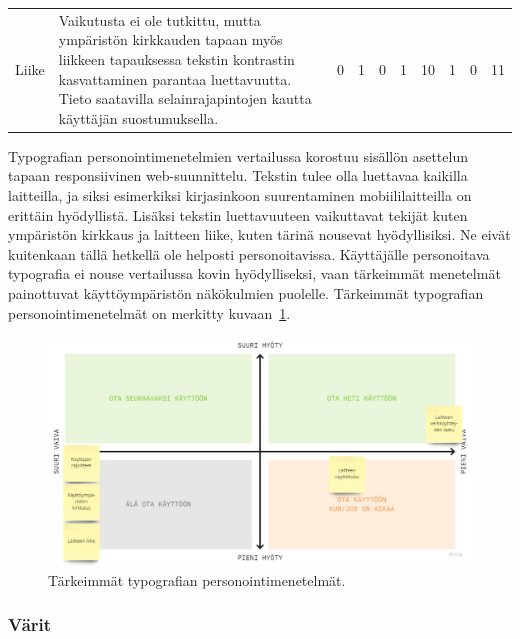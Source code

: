 \documentclass[finnish, 12pt, a4paper, elec, utf8, a-1b, online]{aaltothesis}
\begin{document}
{\begin{longtable}{p{2.5cm}|p{6cm}|p{0.5cm}p{0.5cm}p{0.5cm}|p{0.5cm}|p{0.5cm}p{0.5cm}p{0.5cm}|p{0.5cm}|}
        \midrule
        Liike                                  & Vaikutusta ei ole tutkittu, mutta ympäristön kirkkauden tapaan myös liikkeen tapauksessa tekstin kontrastin kasvattaminen parantaa luettavuutta. Tieto saatavilla selainrajapintojen kautta käyttäjän suostumuksella.                                         & 0                                          & 1                                   & 0                                      & 1                            & 10                                              & 1                                         & 0                                         & 11                           \\
    \end{longtable}
}

Typografian personointimenetelmien vertailussa korostuu sisällön asettelun
tapaan responsiivinen web-suunnittelu. Tekstin tulee olla luettavaa kaikilla
laitteilla, ja siksi esimerkiksi kirjasinkoon suurentaminen mobiililaitteilla on
erittäin hyödyllistä. Lisäksi tekstin luettavuuteen vaikuttavat tekijät kuten
ympäristön kirkkaus ja laitteen liike, kuten tärinä nousevat hyödyllisiksi. Ne
eivät kuitenkaan tällä hetkellä ole helposti personoitavissa. Käyttäjälle
personoitava typografia ei nouse vertailussa kovin hyödylliseksi, vaan
tärkeimmät menetelmät painottuvat käyttöympäristön näkökulmien puolelle.
Tärkeimmät typografian personointimenetelmät on merkitty
kuvaan~\ref{fig:typography-priorization}.

\begin{figure}[htb]
    \centering
    \includegraphics[width=\textwidth]{images/typography-priorization.pdf}
    \caption{Tärkeimmät typografian personointimenetelmät.~\label{fig:typography-priorization}}
\end{figure}

\subsubsection{Värit}
\end{document}
